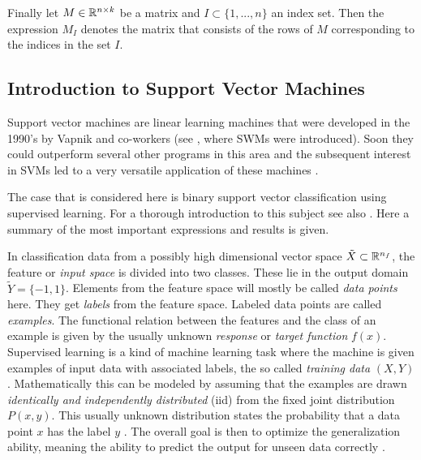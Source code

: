 Finally let \(M \in \mathbb{R}^{n\times k}\) be a matrix and \(I \subset \{1,...,n\}\) an index set. Then the expression \(M_{I}\) denotes the matrix that consists of the rows of \(M\) corresponding to the indices in the set \(I\). %

%

\subsection{Introduction to Support Vector Machines}
Support vector machines are linear learning machines that were developed in the 1990's by Vapnik and co-workers (see \cite{Boser1992}, where SWMs were introduced). Soon they could outperform several other programs in this area \cite{Cristianini2000} and the subsequent interest in SVMs led to a very versatile application of these machines \cite{Kunapuli2008}.

The case that is considered here is binary support vector classification using supervised learning. 
For a thorough introduction to this subject see also \cite{Cristianini2000}. Here a summary of the most important expressions and results is given.

In classification data from a possibly high dimensional vector space \(\tilde{X} \subset \mathbb{R}^{n_f}\), the feature or \emph{input space} is divided into two classes. These lie in the output domain \(\tilde{Y} = \{-1,1\}\). Elements from the feature space will mostly be called \emph{data points} here. They get \emph{labels} from the feature space. Labeled data points are called \emph{examples}.
The functional relation between the features and the class of an example is given by the usually unknown \emph{response} or \emph{target function} \(f(x)\).
Supervised learning is a kind of machine learning task where the machine is given examples of input data with associated labels, the so called \emph{training data} \((X,Y)\). Mathematically this can be modeled by assuming that the examples are  drawn \emph{identically and independently distributed} (iid) from the fixed joint distribution \(P(x,y)\). This usually unknown distribution states the probability that a data point \(x\) has the label \(y\) \cite[p. 988]{Vapnik1999}.
The overall goal is then to optimize the generalization ability, meaning the ability to predict the output for unseen data correctly \cite[chapter 1.2]{Cristianini2000}.

